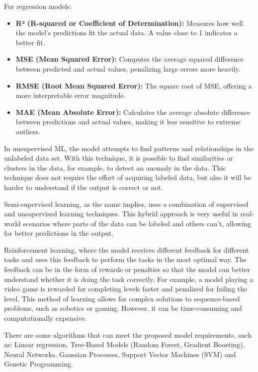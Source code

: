 For regression models:
\begin{itemize}
    \item \textbf{R² (R-squared or Coefficient of Determination):} Measures how well the model's predictions fit the actual data. A value close to 1 indicates a better fit.
    \item \textbf{MSE (Mean Squared Error):} Computes the average squared difference between predicted and actual values, penalizing large errors more heavily.
    \item \textbf{RMSE (Root Mean Squared Error):} The square root of MSE, offering a more interpretable error magnitude.
    \item \textbf{MAE (Mean Absolute Error):} Calculates the average absolute difference between predictions and actual values, making it less sensitive to extreme outliers.
\end{itemize}


In unsupervised ML, the model attempts to find patterns and relationships in the unlabeled data set. With this technique, it is possible to find similarities or clusters in the data, for example, to detect an anomaly in the data. This technique does not require the effort of acquiring labeled data, but also it will be harder to understand if the output is correct or not.

Semi-supervised learning, as the name implies, uses a combination of supervised and unsupervised learning techniques. This hybrid approach is very useful in real-world scenarios where parts of the data can be labeled and others can't, allowing for better predictions in the output.

Reinforcement learning, where the model receives different feedback for different tasks and uses this feedback to perform the tasks in the most optimal way. The feedback can be in the form of rewards or penalties so that the model can better understand whether it is doing the task correctly. For example, a model playing a video game is rewarded for completing levels faster and penalized for failing the level. This method of learning allows for complex solutions to sequence-based problems, such as robotics or gaming. However, it can be time-consuming and computationally expensive.

There are some algorithms that can meet the proposed model requirements, such as: Linear regression, Tree-Based Models (Random Forest, Gradient Boosting), Neural Networks, Gaussian Processes, Support Vector Machines (SVM) and Genetic Programming.

